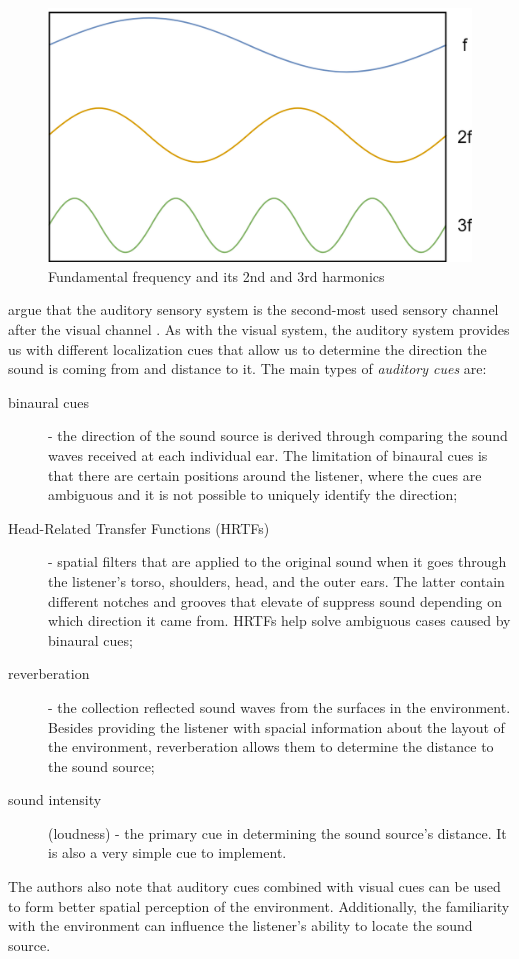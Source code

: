 \begin{figure}
	\centering
	\includegraphics[width=0.7\linewidth]{figures/fundamental_frequency_and_harmonics}
	\caption{Fundamental frequency and its 2nd and 3rd harmonics}
	\label{fig:fundamentalfrequencyandharmonics}
\end{figure}

\parencite[p.~46]{jr_3d_2017} argue that the auditory sensory system is the second-most used sensory channel after the visual channel . As with the visual system, the auditory system provides us with different localization cues that allow us to determine the direction the sound is coming from and distance to it. The main types of \textit{auditory cues }are:
\begin{description}
	\item[binaural cues] - the direction of the sound source is derived through comparing the sound waves received at each individual ear. The limitation of binaural cues is that there are certain positions around the listener, where the cues are ambiguous and it is not possible to uniquely identify the direction;
	\item[Head-Related Transfer Functions (HRTFs)] - spatial filters that are applied to the original sound when it goes through the listener's torso, shoulders, head, and the outer ears. The latter contain different notches and grooves that elevate of suppress sound depending on which direction it came from. HRTFs help solve ambiguous cases caused by binaural cues;
	\item[reverberation] - the collection reflected sound waves from the surfaces in the environment. Besides providing the listener with spacial information about the layout of the environment, reverberation allows them to determine the distance to the sound source;
	\item[sound intensity] (loudness) - the primary cue in determining the sound source's distance. It is also a very simple cue to implement.
\end{description}
The authors also note that auditory cues combined with visual cues can be used to form better spatial perception of the environment. Additionally, the familiarity with the environment can influence the listener's ability to locate the sound source.

